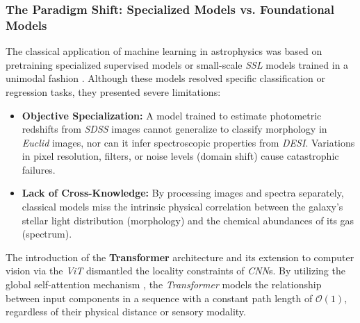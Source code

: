 \subsubsection{The Paradigm Shift: Specialized Models vs. Foundational Models}

The classical application of machine learning in astrophysics was based on pretraining specialized supervised models \autocites{ar:huertas-company-2015}{ar:dominguez-sanchez-2018} or small-scale \textit{\gls{SSL}} models trained in a unimodal fashion \autocites{ar:hayat-2021}{ar:sarmiento-2021}. Although these models resolved specific classification or regression tasks, they presented severe limitations:

\begin{itemize}
  \item \textbf{Objective Specialization:} A model trained to estimate photometric redshifts from \textit{\gls{SDSS}} images cannot generalize to classify morphology in \textit{Euclid} images, nor can it infer spectroscopic properties from \textit{\gls{DESI}}. Variations in pixel resolution, filters, or noise levels (domain shift) cause catastrophic failures.
  \item \textbf{Lack of Cross-Knowledge:} By processing images and spectra separately, classical models miss the intrinsic physical correlation between the galaxy's stellar light distribution (morphology) and the chemical abundances of its gas (spectrum).
\end{itemize}

The introduction of the \textbf{Transformer} architecture \autocite{ar:attention} and its extension to computer vision via the \textit{\gls{ViT}} \autocite{ar:dosovitskiy-2020} dismantled the locality constraints of \textit{\gls{CNN}}s. By utilizing the global self-attention mechanism \autocite{ar:attention}, the \textit{Transformer} models the relationship between input components in a sequence with a constant path length of $\mathcal{O}\left(1\right)$, regardless of their physical distance or sensory modality.

